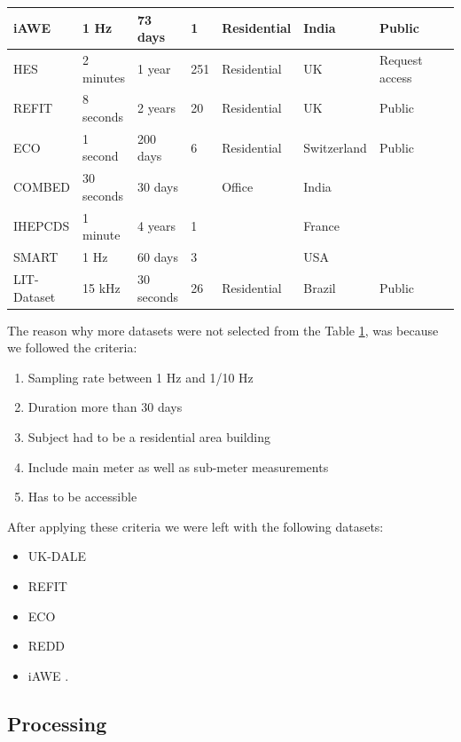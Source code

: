 \begin{table}[H]
{\begin{tabular}{|l|l|l|l|l|l|l|l|l|}
        iAWE & 1 Hz & 73 days & 1 & Residential & India & Public \\ \hline
        HES & 2 minutes & 1 year & 251 & Residential & UK & Request access \\ \hline
        REFIT & 8 seconds & 2 years & 20 & Residential & UK & Public \\ \hline
        ECO & 1 second & 200 days & 6 & Residential & Switzerland & Public \\ \hline
        COMBED & 30 seconds & 30 days & ~ & Office & India & ~ \\ \hline
        IHEPCDS & 1 minute & 4 years & 1 & ~ & France & ~ \\ \hline
        SMART & 1 Hz & 60 days & 3 & ~ & USA & ~ \\ \hline
        LIT-Dataset & 15 kHz & 30 seconds & 26 & Residential & Brazil & Public \\ \hline
    \end{tabular}}
    \label{tab:other_datasets}
\end{table}

The reason why more datasets were not selected from the Table \ref{tab:other_datasets},
was because we followed the criteria:
\begin{enumerate}
    \item Sampling rate between 1 Hz and 1/10 Hz
    \item Duration more than 30 days
    \item Subject had to be a residential area building
    \item Include main meter as well as sub-meter measurements
    \item Has to be accessible
\end{enumerate}

After applying these criteria we were left with the following datasets:

\begin{itemize}
    \item UK-DALE \cite{UKDALE}
    \item REFIT \cite{REFIT}
    \item ECO \cite{ECO}
    \item REDD \cite{REDD}
    \item iAWE \cite{iAWE}.
\end{itemize}

\subsection{Processing}

